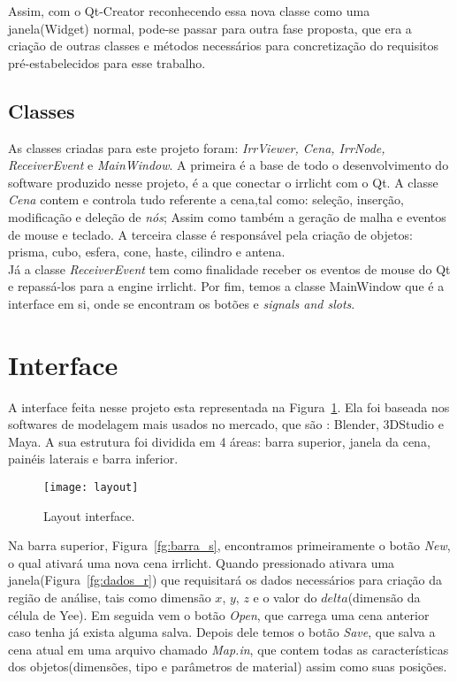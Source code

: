 	Assim, com o Qt-Creator reconhecendo essa nova classe como uma janela(Widget) normal, pode-se passar para outra fase proposta, que era a criação de outras classes e métodos necessários para concretização do requisitos pré-estabelecidos para esse trabalho.

	\subsection{Classes}
	As classes criadas para este projeto foram: \textit{IrrViewer, Cena, IrrNode, ReceiverEvent} e \textit{MainWindow}. A primeira é a base de todo o desenvolvimento do software produzido nesse projeto, é a que conectar o irrlicht com o Qt. A classe \textit{Cena} contem e controla tudo referente a cena,tal como: seleção, inserção, modificação e deleção de \textit{nós}; Assim como também a geração de malha e eventos de mouse e teclado. A terceira classe é responsável pela criação de objetos: prisma, cubo, esfera, cone, haste, cilindro e antena.\\
	
	Já a classe \textit{ReceiverEvent} tem como finalidade receber os eventos de mouse do Qt e repassá-los para a engine irrlicht. Por fim, temos a classe MainWindow que é a interface em si, onde se encontram os botões e \textit{signals and slots}\cite{qt}.

\section{Interface}
A interface feita nesse projeto esta representada na Figura~\ref{fg:layout}. Ela foi baseada nos softwares de modelagem mais usados no mercado, que são : Blender, 3DStudio e Maya. A sua estrutura foi dividida em 4 áreas: barra superior, janela da cena, painéis laterais e barra inferior.\\

\begin{figure}[ht!]
	\centering
	\texttt{[image: layout]}
	\caption{Layout interface.}
	\label{fg:layout}
\end{figure}

Na barra superior, Figura~\ref{fg:barra_s}, encontramos primeiramente o botão \textit{New}, o qual ativará uma nova cena irrlicht. Quando pressionado ativara uma janela(Figura~\ref{fg:dados_r}) que requisitará os dados necessários para criação da região de análise, tais como dimensão $x$, $y$, $z$ e o valor do $delta$(dimensão da célula de Yee). Em seguida vem o botão \textit{Open}, que carrega uma cena anterior caso tenha já exista alguma salva. Depois dele temos o botão \textit{Save}, que salva a cena atual em uma arquivo chamado \textit{Map.in}, que contem todas as características dos objetos(dimensões, tipo e parâmetros de material) assim como suas posições.\\

